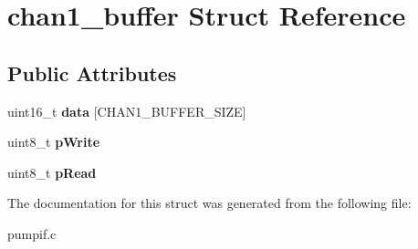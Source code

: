 \hypertarget{structchan1__buffer}{\section{chan1\-\_\-buffer Struct Reference}
\label{structchan1__buffer}
}
\subsection*{Public Attributes}
\begin{DoxyCompactItemize}
\item 
\hypertarget{structchan1__buffer_ac20ff953e8fad2d0708b10237bcf7c7b}{uint16\-\_\-t {\bfseries data} \mbox{[}C\-H\-A\-N1\-\_\-\-B\-U\-F\-F\-E\-R\-\_\-\-S\-I\-Z\-E\mbox{]}}\label{structchan1__buffer_ac20ff953e8fad2d0708b10237bcf7c7b}

\item 
\hypertarget{structchan1__buffer_ae2c6fcde3121683eaf5b5d0552660647}{uint8\-\_\-t {\bfseries p\-Write}}\label{structchan1__buffer_ae2c6fcde3121683eaf5b5d0552660647}

\item 
\hypertarget{structchan1__buffer_acf2c083d810c34a248b8a07790d57373}{uint8\-\_\-t {\bfseries p\-Read}}\label{structchan1__buffer_acf2c083d810c34a248b8a07790d57373}

\end{DoxyCompactItemize}


The documentation for this struct was generated from the following file\-:\begin{DoxyCompactItemize}
\item 
pumpif.\-c\end{DoxyCompactItemize}
